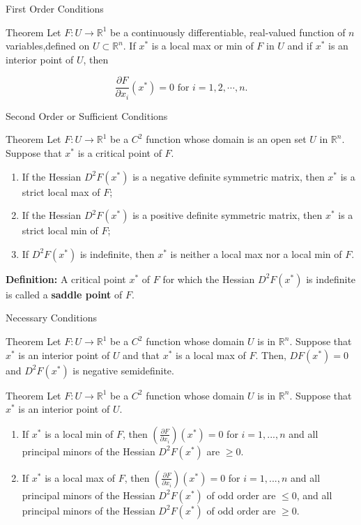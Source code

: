 \documentclass{beamer}
\begin{document}
\begin{frame}{First Order Conditions}
\begin{block}{Theorem}
    Let $F:U\to \mathbb{R}^1$ be a continuously differentiable, real-valued function of $n$ variables,defined on $U\subset \mathbb{R}^n$. If $x^*$ is a local max or min of $F$ in $U$ and if $x^*$ is an interior point of $U$, then
    
    \[\frac{\partial F}{\partial x_i}(x^*)=0 \text{ for }i=1,2,\cdots,n. 
    \]
\end{block}
    
\end{frame}
\begin{frame}{Second Order or Sufficient Conditions}
 \begin{block}{Theorem}
    Let $F:U\to \mathbb{R}^1$ be a $C^2$ function whose domain is an open set $U$ in $\mathbb{R}^n$. Suppose that $x^*$ is a critical point of $F$.
    \begin{enumerate}
        \item If the Hessian $D^2F(x^*)$ is a negative definite symmetric matrix, then $x^*$ is a strict local max of $F$;
        \item If the Hessian $D^2F(x^*)$ is a positive definite symmetric matrix, then $x^*$ is a strict local min of $F$;
        \item If $D^2F(x^*)$ is indefinite, then $x^*$ is neither a local max nor a local min of $F$. 
    \end{enumerate}
\end{block}   
\textbf{Definition: } A critical point $x^*$ of $F$ for which the Hessian $D^2F(x^*)$ is indefinite is called a \textbf{saddle point} of $F$. 
\end{frame}
\begin{frame}{Necessary Conditions}
\begin{block}{Theorem}
   Let  $F:U\to \mathbb{R}^1$ be a $C^2$ function whose domain  $U$ is in $\mathbb{R}^n$. Suppose that $x^*$ is an interior point of $U$ and that $x^*$ is a local max of $F$. Then, $DF(x^*)=0$ and $D^2F(x^*)$ is negative semidefinite. 
\end{block}
\begin{block}{Theorem}
      Let  $F:U\to \mathbb{R}^1$ be a $C^2$ function whose domain  $U$ is in $\mathbb{R}^n$. Suppose that $x^*$ is an interior point of $U$. 
      \begin{enumerate}
          \item If $x^*$ is a local min of $F$, then $(\frac{\partial F}{\partial x_i})(x^*)=0$ for $i=1,..., n $ and all principal minors of the Hessian $D^2F(x^*)$ are $\geq 0$.
          \item If $x^*$ is a local max of $F$, then $(\frac{\partial F}{\partial x_i})(x^*)=0$ for $i=1,..., n $ and all principal minors of the Hessian $D^2F(x^*)$ of odd order are $\leq 0$, and all principal minors of the Hessian $D^2F(x^*)$ of odd order are $\geq 0$.
      \end{enumerate}
\end{block}
\end{frame}
\end{document}
